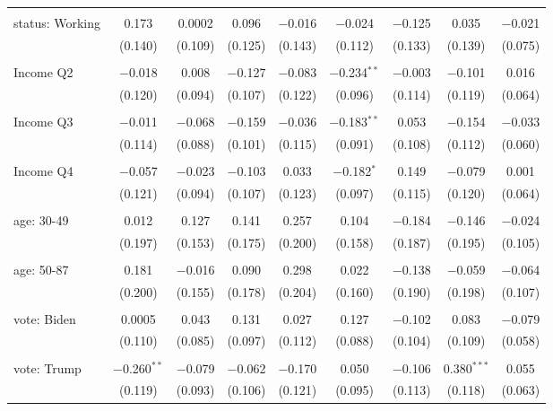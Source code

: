 \begin{tabular}{@{\extracolsep{5pt}}lcccccccc}
  & & & & & & & & \\ 
 status: Working & 0.173 & 0.0002 & 0.096 & $-$0.016 & $-$0.024 & $-$0.125 & 0.035 & $-$0.021 \\ 
  & (0.140) & (0.109) & (0.125) & (0.143) & (0.112) & (0.133) & (0.139) & (0.075) \\ 
  & & & & & & & & \\ 
 Income Q2 & $-$0.018 & 0.008 & $-$0.127 & $-$0.083 & $-$0.234$^{**}$ & $-$0.003 & $-$0.101 & 0.016 \\ 
  & (0.120) & (0.094) & (0.107) & (0.122) & (0.096) & (0.114) & (0.119) & (0.064) \\ 
  & & & & & & & & \\ 
 Income Q3 & $-$0.011 & $-$0.068 & $-$0.159 & $-$0.036 & $-$0.183$^{**}$ & 0.053 & $-$0.154 & $-$0.033 \\ 
  & (0.114) & (0.088) & (0.101) & (0.115) & (0.091) & (0.108) & (0.112) & (0.060) \\ 
  & & & & & & & & \\ 
 Income Q4 & $-$0.057 & $-$0.023 & $-$0.103 & 0.033 & $-$0.182$^{*}$ & 0.149 & $-$0.079 & 0.001 \\ 
  & (0.121) & (0.094) & (0.107) & (0.123) & (0.097) & (0.115) & (0.120) & (0.064) \\ 
  & & & & & & & & \\ 
 age: 30-49 & 0.012 & 0.127 & 0.141 & 0.257 & 0.104 & $-$0.184 & $-$0.146 & $-$0.024 \\ 
  & (0.197) & (0.153) & (0.175) & (0.200) & (0.158) & (0.187) & (0.195) & (0.105) \\ 
  & & & & & & & & \\ 
 age: 50-87 & 0.181 & $-$0.016 & 0.090 & 0.298 & 0.022 & $-$0.138 & $-$0.059 & $-$0.064 \\ 
  & (0.200) & (0.155) & (0.178) & (0.204) & (0.160) & (0.190) & (0.198) & (0.107) \\ 
  & & & & & & & & \\ 
 vote: Biden & 0.0005 & 0.043 & 0.131 & 0.027 & 0.127 & $-$0.102 & 0.083 & $-$0.079 \\ 
  & (0.110) & (0.085) & (0.097) & (0.112) & (0.088) & (0.104) & (0.109) & (0.058) \\ 
  & & & & & & & & \\ 
 vote: Trump & $-$0.260$^{**}$ & $-$0.079 & $-$0.062 & $-$0.170 & 0.050 & $-$0.106 & 0.380$^{***}$ & 0.055 \\ 
  & (0.119) & (0.093) & (0.106) & (0.121) & (0.095) & (0.113) & (0.118) & (0.063) \\ 

\end{tabular}
